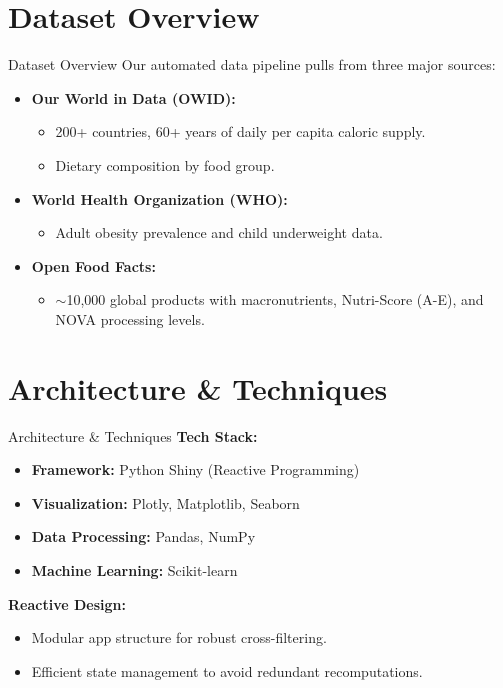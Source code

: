 \documentclass[aspectratio=169]{beamer}
\begin{document}
\section{Dataset Overview}
\begin{frame}{Dataset Overview}
    Our automated data pipeline pulls from three major sources:
    
    \vspace{0.3cm}
    \begin{itemize}
        \item \textbf{Our World in Data (OWID):} 
        \begin{itemize}
            \item 200+ countries, 60+ years of daily per capita caloric supply.
            \item Dietary composition by food group.
        \end{itemize}
        \vspace{0.2cm}
        \item \textbf{World Health Organization (WHO):} 
        \begin{itemize}
            \item Adult obesity prevalence and child underweight data.
        \end{itemize}
        \vspace{0.2cm}
        \item \textbf{Open Food Facts:} 
        \begin{itemize}
            \item $\sim$10,000 global products with macronutrients, Nutri-Score (A-E), and NOVA processing levels.
        \end{itemize}
    \end{itemize}
\end{frame}

\section{Architecture \& Techniques}
\begin{frame}{Architecture \& Techniques}
    \textbf{Tech Stack:}
    \begin{itemize}
        \item \textbf{Framework:} Python Shiny (Reactive Programming)
        \item \textbf{Visualization:} Plotly, Matplotlib, Seaborn
        \item \textbf{Data Processing:} Pandas, NumPy
        \item \textbf{Machine Learning:} Scikit-learn
    \end{itemize}
    
    \vspace{0.5cm}
    \textbf{Reactive Design:}
    \begin{itemize}
        \item Modular app structure for robust cross-filtering.
        \item Efficient state management to avoid redundant recomputations.
    \end{itemize}
\end{frame}
\end{document}
